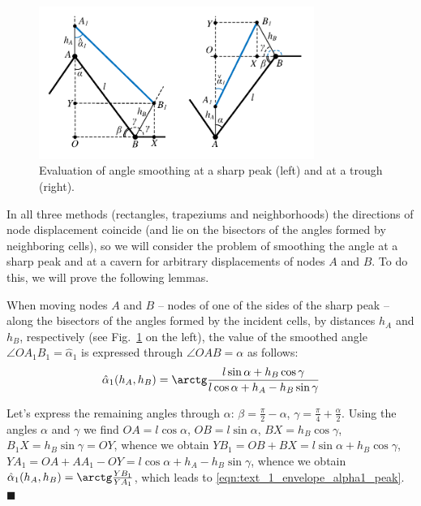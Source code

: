 \documentclass[
11pt,%
tightenlines,%
twoside,%
onecolumn,%
nofloats,%
nobibnotes,%
nofootinbib,%
superscriptaddress,%
noshowpacs,%
centertags]%
{revtex4}
\begin{document}
\begin{figure}[ht]
\setcaptionmargin{5mm}
\onelinecaptionstrue  %
\includegraphics[width=0.8\textwidth]{./pics/peak-cavern-general.pdf}
\caption{Evaluation of angle smoothing at a sharp peak (left) and at a trough (right).}
\label{fig:text_1_remesh_2d_peak_cavern_general}
\end{figure}

In all three methods (rectangles, trapeziums and neighborhoods) the directions of node displacement coincide (and lie on the bisectors of the angles formed by neighboring cells), so we will consider the problem of smoothing the angle at a sharp peak and at a cavern for arbitrary displacements of nodes $A$ and $B$. To do this, we will prove the following lemmas.

\begin{lemma}\label{lem:text_1_peak_smooth}
When moving nodes $A$ and $B$ -- nodes of one of the sides of the sharp peak -- along the bisectors of the angles formed by the incident cells, by distances $h_A$ and $h_B$, respectively (see Fig.~\ref{fig:text_1_remesh_2d_peak_cavern_general} on the left), the value of the smoothed angle $\angle OA_1B_1 = \hat{\alpha}_1$ is expressed through $\angle OAB = \alpha$ as follows:
\begin{equation}\label{eqn:text_1_envelope_alpha1_peak}
\hat{\alpha}_1(h_A, h_B) = \arctg \frac{l \sin \alpha + h_B \cos \gamma}{l \cos \alpha + h_A - h_B \sin \gamma}	
\end{equation}
\end{lemma}

Let's express the remaining angles through $\alpha$: $\beta = \frac{\pi}{2} - \alpha$, $\gamma = \frac{\pi}{4} + \frac{\alpha}{2}$. Using the angles $\alpha$ and $\gamma$ we find $OA = l \cos \alpha$, $OB = l \sin \alpha$, $BX = h_B \cos \gamma$, $B_1X = h_B \sin \gamma = OY$, whence we obtain $YB_1 = OB + BX = l \sin \alpha + h_B \cos \gamma$, $YA_1 = OA + AA_1 - OY = l \cos \alpha + h_A - h_B \sin \gamma$, whence we obtain $\hat{\alpha}_1(h_A, h_B) = \arctg \frac{YB_1}{YA_1}$, which leads to \eqref{eqn:text_1_envelope_alpha1_peak}.
$\blacksquare$\\
\end{document}
